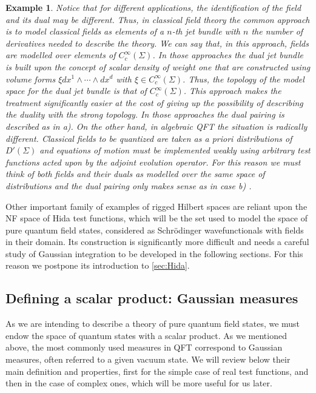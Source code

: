\documentclass{elsarticle}%
\newtheorem{example}{Example}%
\begin{document}
\begin{example}
Notice that for different applications, the identification of the field and its dual may be different. Thus, in  classical field theory the common approach \cite{gotayMomentumMaps2004a,gotayMomentumMaps2004} is to model classical fields as elements of a $n$-th jet bundle with $n$ the number of derivatives needed to describe the theory. We can say that, in this approach, fields are modelled over elements of  $C^\infty_c(\Sigma)$. In those approaches the dual jet bundle is built upon the concept of scalar density of weight one  that are constructed using volume forms $\xi dx^1\wedge \cdots\wedge dx^d$ with $\xi\in C^\infty_c(\Sigma)$.  Thus, the topology of the model space for the dual jet bundle is that of  $C^\infty_c(\Sigma)$. This approach makes the treatment significantly easier at the cost of giving up the possibility of describing the duality with the strong topology. In those approaches the dual pairing is described as in a). On the other hand, in  algebraic QFT the situation is radically different. Classical fields to be quantized are taken as a priori distributions of $D'(\Sigma)$   and equations of motion must be implemented weakly using arbitrary test functions acted upon by the adjoint evolution operator.  For this reason we must think of both fields and their duals as  modelled over the same space of distributions   and the dual pairing only makes sense as in case b) \cite{brunettiAdvancesAlgebraic2015}. 

\end{example}


Other important family of examples of rigged Hilbert spaces are reliant upon the NF space of  Hida test functions, which will be the set used to model the space of  pure quantum field states, considered as Schrödinger wavefunctionals with fields in their domain. Its construction is significantly more difficult and needs a careful study of Gaussian integration to be developed in the following sections. For this reason  we postpone its introduction to \autoref{sec:Hida}. 

\subsection{Defining a scalar product: Gaussian measures}
As we are intending to  describe a theory of  pure quantum field states, we must endow the space of quantum states with a scalar product.  As we mentioned above, the most commonly used measures in QFT correspond to Gaussian measures, often referred to a given vacuum state. 
We will review below their main definition and  properties, first for the simple case of real test functions, and then in the case of complex ones, which will be more useful for us later.
\end{document}
